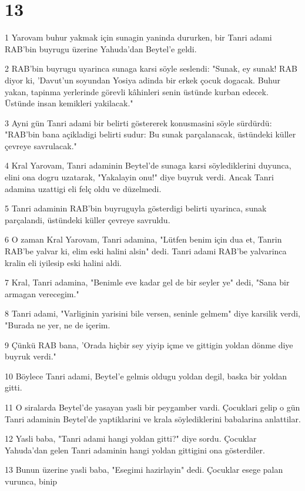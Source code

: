 \chapter{13}

\par 1 Yarovam buhur yakmak için sunagin yaninda dururken, bir Tanri adami RAB'bin buyrugu üzerine Yahuda'dan Beytel'e geldi.
\par 2 RAB'bin buyrugu uyarinca sunaga karsi söyle seslendi: "Sunak, ey sunak! RAB diyor ki, 'Davut'un soyundan Yosiya adinda bir erkek çocuk dogacak. Buhur yakan, tapinma yerlerinde görevli kâhinleri senin üstünde kurban edecek. Üstünde insan kemikleri yakilacak."
\par 3 Ayni gün Tanri adami bir belirti göstererek konusmasini söyle sürdürdü: "RAB'bin bana açikladigi belirti sudur: Bu sunak parçalanacak, üstündeki küller çevreye savrulacak."
\par 4 Kral Yarovam, Tanri adaminin Beytel'de sunaga karsi söylediklerini duyunca, elini ona dogru uzatarak, "Yakalayin onu!" diye buyruk verdi. Ancak Tanri adamina uzattigi eli felç oldu ve düzelmedi.
\par 5 Tanri adaminin RAB'bin buyruguyla gösterdigi belirti uyarinca, sunak parçalandi, üstündeki küller çevreye savruldu.
\par 6 O zaman Kral Yarovam, Tanri adamina, "Lütfen benim için dua et, Tanrin RAB'be yalvar ki, elim eski halini alsin" dedi. Tanri adami RAB'be yalvarinca kralin eli iyilesip eski halini aldi.
\par 7 Kral, Tanri adamina, "Benimle eve kadar gel de bir seyler ye" dedi, "Sana bir armagan verecegim."
\par 8 Tanri adami, "Varliginin yarisini bile versen, seninle gelmem" diye karsilik verdi, "Burada ne yer, ne de içerim.
\par 9 Çünkü RAB bana, 'Orada hiçbir sey yiyip içme ve gittigin yoldan dönme diye buyruk verdi."
\par 10 Böylece Tanri adami, Beytel'e gelmis oldugu yoldan degil, baska bir yoldan gitti.
\par 11 O siralarda Beytel'de yasayan yasli bir peygamber vardi. Çocuklari gelip o gün Tanri adaminin Beytel'de yaptiklarini ve krala söylediklerini babalarina anlattilar.
\par 12 Yasli baba, "Tanri adami hangi yoldan gitti?" diye sordu. Çocuklar Yahuda'dan gelen Tanri adaminin hangi yoldan gittigini ona gösterdiler.
\par 13 Bunun üzerine yasli baba, "Esegimi hazirlayin" dedi. Çocuklar esege palan vurunca, binip
